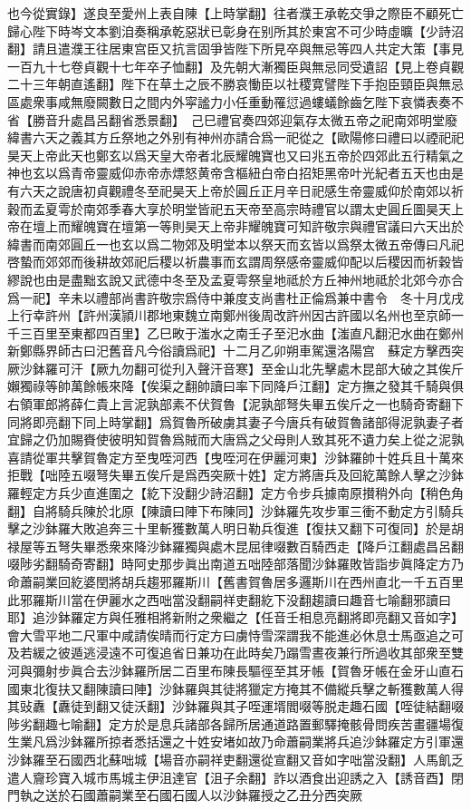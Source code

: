 也今從實錄】遂良至愛州上表自陳【上時掌翻】往者濮王承乾交爭之際臣不顧死亡歸心陛下時岑文本劉洎奏稱承乾惡狀已彰身在别所其於東宮不可少時虛曠【少詩沼翻】請且遣濮王往居東宫臣又抗言固爭皆陛下所見卒與無忌等四人共定大策【事見一百九十七卷貞觀十七年卒子恤翻】及先朝大漸獨臣與無忌同受遺詔【見上卷貞觀二十三年朝直遙翻】陛下在草土之辰不勝哀慟臣以社稷寛譬陛下手抱臣頸臣與無忌區處衆事咸無廢闕數日之間内外寜謐力小任重動罹愆過螻蟻餘齒乞陛下哀憐表奏不省【勝音升處昌呂翻省悉景翻】　己巳禮官奏四郊迎氣存太微五帝之祀南郊明堂廢緯書六天之義其方丘祭地之外别有神州亦請合爲一祀從之【歐陽修曰禮曰以禋祀祀昊天上帝此天也鄭玄以爲天皇大帝者北辰耀魄寶也又曰兆五帝於四郊此五行精氣之神也玄以爲青帝靈威仰赤帝赤熛怒黄帝含樞紐白帝白招矩黑帝叶光紀者五天也由是有六天之說唐初貞觀禮冬至祀昊天上帝於圓丘正月辛日祀感生帝靈威仰於南郊以祈穀而孟夏雩於南郊季春大享於明堂皆祀五天帝至高宗時禮官以謂太史圓丘圖昊天上帝在壇上而耀魄寶在壇第一等則昊天上帝非耀魄寶可知許敬宗與禮官議曰六天出於緯書而南郊圓丘一也玄以爲二物郊及明堂本以祭天而玄皆以爲祭太微五帝傳曰凡祀啓蟄而郊郊而後耕故郊祀后稷以祈農事而玄謂周祭感帝靈威仰配以后稷因而祈穀皆繆說也由是盡黜玄說又武德中冬至及孟夏雩祭皇地祗於方丘神州地祗於北郊今亦合爲一祀】辛未以禮部尚書許敬宗爲侍中兼度支尚書杜正倫爲兼中書令　冬十月戊戌上行幸許州【許州漢頴川郡地東魏立南鄭州後周改許州因古許國以名州也至京師一千三百里至東都四百里】乙巳畋于滍水之南壬子至汜水曲【滍直凡翻汜水曲在鄭州新鄭縣界師古曰汜舊音凡今俗讀爲祀】十二月乙卯朔車駕還洛陽宫　蘇定方擊西突厥沙鉢羅可汗【厥九勿翻可從刋入聲汗音寒】至金山北先擊處木昆部大破之其俟斤嬾獨祿等帥萬餘帳來降【俟渠之翻帥讀曰率下同降戶江翻】定方撫之發其千騎與俱右領軍郎將薛仁貴上言泥孰部素不伏賀魯【泥孰部弩失畢五俟斤之一也騎奇寄翻下同將即亮翻下同上時掌翻】爲賀魯所破虜其妻子今唐兵有破賀魯諸部得泥孰妻子者宜歸之仍加賜賚使彼明知賀魯爲賊而大唐爲之父母則人致其死不遺力矣上從之泥孰喜請從軍共擊賀魯定方至曳咥河西【曳咥河在伊麗河東】沙鉢羅帥十姓兵且十萬來拒戰【咄陸五啜弩失畢五俟斤是爲西突厥十姓】定方將唐兵及回紇萬餘人擊之沙鉢羅輕定方兵少直進圍之【紇下没翻少詩沼翻】定方令步兵據南原攅稍外向【稍色角翻】自將騎兵陳於北原【陳讀曰陣下布陳同】沙鉢羅先攻步軍三衝不動定方引騎兵擊之沙鉢羅大敗追奔三十里斬獲數萬人明日勒兵復進【復扶又翻下可復同】於是胡禄屋等五弩失畢悉衆來降沙鉢羅獨與處木昆屈律啜數百騎西走【降戶江翻處昌呂翻啜陟劣翻騎奇寄翻】時阿史那步眞出南道五咄陸部落聞沙鉢羅敗皆詣步眞降定方乃命蕭嗣業回紇婆閏將胡兵趨邪羅斯川【舊書賀魯居多邏斯川在西州直北一千五百里此邪羅斯川當在伊麗水之西咄當没翻嗣祥吏翻紇下没翻趨讀曰趣音七喻翻邪讀曰耶】追沙鉢羅定方與任雅相將新附之衆繼之【任音壬相息亮翻將即亮翻又音如字】會大雪平地二尺軍中咸請俟晴而行定方曰虜恃雪深謂我不能進必休息士馬亟追之可及若緩之彼遁逃浸遠不可復追省日兼功在此時矣乃蹋雪晝夜兼行所過收其部衆至雙河與彌射步眞合去沙鉢羅所居二百里布陳長驅徑至其牙帳【賀魯牙帳在金牙山直石國東北復扶又翻陳讀曰陣】沙鉢羅與其徒將獵定方掩其不備縱兵擊之斬獲數萬人得其䜴纛【纛徒到翻又徒沃翻】沙鉢羅與其子咥運壻閻啜等脱走趣石國【咥徒結翻啜陟劣翻趣七喻翻】定方於是息兵諸部各歸所居通道路置郵驛掩骸骨問疾苦畫疆場復生業凡爲沙鉢羅所掠者悉括還之十姓安堵如故乃命蕭嗣業將兵追沙鉢羅定方引軍還沙鉢羅至石國西北蘇咄城【場音亦嗣祥吏翻還從宣翻又音如字咄當没翻】人馬飢乏遣人齎珍寶入城市馬城主伊沮達官【沮子余翻】詐以酒食出迎誘之入【誘音酉】閉門執之送於石國蕭嗣業至石國石國人以沙鉢羅授之乙丑分西突厥